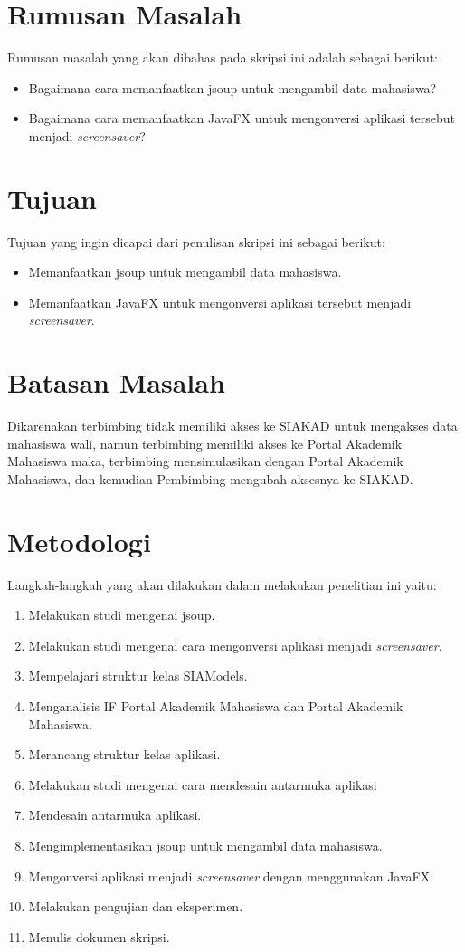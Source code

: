 \section{Rumusan Masalah}
\label{sec:rumusan}
Rumusan masalah yang akan dibahas pada skripsi ini adalah sebagai berikut:
\begin{itemize}
	\item Bagaimana cara memanfaatkan jsoup untuk mengambil data mahasiswa?
	\item Bagaimana cara memanfaatkan JavaFX untuk mengonversi aplikasi tersebut menjadi \textit{screensaver}?
\end{itemize}   

\section{Tujuan}
\label{sec:tujuan}
Tujuan yang ingin dicapai dari penulisan skripsi ini sebagai berikut:
\begin{itemize}
    \item Memanfaatkan jsoup untuk mengambil data mahasiswa.
    \item Memanfaatkan JavaFX untuk mengonversi aplikasi tersebut menjadi \textit{screensaver}.
\end{itemize}

\section{Batasan Masalah}
\label{sec:batasan}
Dikarenakan terbimbing tidak memiliki akses ke SIAKAD untuk mengakses data mahasiswa wali, namun terbimbing memiliki akses ke Portal Akademik Mahasiswa maka, terbimbing mensimulasikan dengan Portal Akademik Mahasiswa, dan kemudian Pembimbing mengubah aksesnya ke SIAKAD. 

\section{Metodologi}
\label{sec:metlit}
Langkah-langkah yang akan dilakukan dalam melakukan penelitian ini yaitu:
	\begin{enumerate}
		\item Melakukan studi mengenai jsoup.
		\item Melakukan studi mengenai cara mengonversi aplikasi menjadi \textit{screensaver}.
		\item Mempelajari struktur kelas SIAModels.
		\item Menganalisis IF Portal Akademik Mahasiswa dan Portal Akademik Mahasiswa.
		\item Merancang struktur kelas aplikasi.
		\item Melakukan studi mengenai cara mendesain antarmuka aplikasi
	    \item Mendesain antarmuka aplikasi.
	    \item Mengimplementasikan jsoup untuk mengambil data mahasiswa.
        \item Mengonversi aplikasi menjadi \textit{screensaver} dengan menggunakan JavaFX. 
		\item Melakukan pengujian dan eksperimen.
		\item Menulis dokumen skripsi.
	\end{enumerate}

